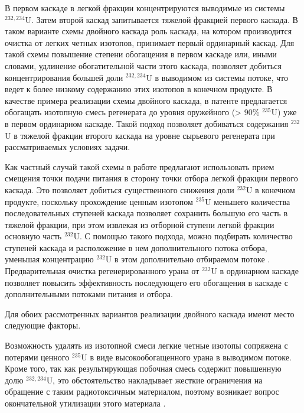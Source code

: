 В первом каскаде в легкой фракции концентрируются выводимые из системы $^{232,234}$U. Затем второй каскад запитывается тяжелой фракцией первого каскада. В таком варианте схемы двойного каскада роль каскада, на котором производится очистка от легких четных изотопов, принимает первый ординарный каскад. Для такой схемы повышение степени обогащения в первом каскаде или, иными словами, удлинение обогатительной части этого каскада, позволяет добиться концентрирования большей доли $^{232,234}$U в выводимом из системы потоке, что ведет к более низкому содержанию этих изотопов в конечном продукте. В качестве примера реализации схемы двойного каскада, в патенте \cite{vodolazskihSposobIzotopnogoVosstanovleniya2006} предлагается обогащать изотопную смесь регенерата до уровня оружейного (> 90\% $^{235}$U) уже в первом ординарном каскаде. Такой подход позволяет добиваться содержания $^{232}$U в тяжелой фракции второго каскада на уровне сырьевого регенерата при рассматриваемых условиях задачи.

Как частный случай такой схемы в работе \cite{palkinOchistkaRegenerirovannogoGeksaftorida2013} предлагают использовать прием смещения точки подачи питания в сторону точки отбора легкой фракции первого каскада. Это позволяет добиться существенного снижения доли $^{232}$U в конечном продукте, поскольку прохождение ценным изотопом $^{235}$U меньшего количества последовательных ступеней каскада позволяет сохранить большую его часть в тяжелой фракции, при этом извлекая из отборной ступени легкой фракции основную часть $^{232}$U. С помощью такого подхода, можно подбирать количество ступеней каскада и расположение в нем дополнительного потока отбора, уменьшая концентрацию $^{232}$U в этом дополнительно отбираемом потоке \cite{palkinOChISTKAREGENERIROVANNOGOURANA2021}. Предварительная очистка регенерированного урана от $^{232}$U в ординарном каскаде позволяет повысить эффективность последующего его обогащения в каскаде с дополнительными потоками питания и отбора. \cite{palkinVOSSTANOVLENIEIZOTOPNOGOSOSTAVA2021}

Для обоих рассмотренных вариантов реализации двойного каскада имеют место следующие факторы.

Возможность удалять из изотопной смеси легкие четные изотопы сопряжена с потерями ценного $^{235}$U в виде высокообогащенного урана в выводимом потоке. Кроме того, так как результирующая побочная смесь содержит повышенную долю $^{232,234}$U, это обстоятельство накладывает жесткие ограничения на обращение с таким радиотоксичным материалом, поэтому возникает вопрос окончательной утилизации этого материала \cite{smirnovApplyingEnrichmentCapacities2018}.

